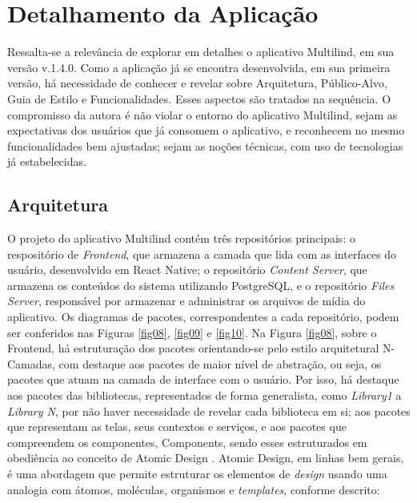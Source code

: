 \section{Detalhamento da Aplicação}
\label{sec:Detalhamento da Aplicacao}
Ressalta-se a relevância de explorar em detalhes o aplicativo Multilind, em sua versão v.1.4.0. Como a aplicação já se encontra desenvolvida, em sua primeira versão, há necessidade de conhecer e revelar sobre Arquitetura, Público-Alvo, Guia de Estilo e Funcionalidades. Esses aspectos são 
tratados na sequência. O compromisso da autora é não violar o entorno do aplicativo Multilind, sejam as expectativas dos usuários que já consomem o aplicativo, e reconhecem no mesmo funcionalidades bem ajustadas; sejam as noções técnicas, com uso de tecnologias já estabelecidas.

\subsection{Arquitetura}
\label{Arquitetura}
O projeto do aplicativo Multilind contém três repositórios principais: o respositório de \textit{Frontend}, que armazena a camada que lida com as interfaces do usuário, desenvolvido em React Native; o repositório \textit{Content Server}, que armazena os conteúdos do sistema 
utilizando PostgreSQL, e o repositório \textit{Files Server}, responsável por armazenar e administrar os arquivos de mídia do aplicativo. Os diagramas de  pacotes, correspondentes a cada repositório, podem ser conferidos nas Figuras \ref{fig08}, \ref{fig09} e \ref{fig10}. Na Figura \ref{fig08}, sobre 
o Frontend, há estruturação dos pacotes orientando-se pelo estilo arquitetural N-Camadas, com destaque aos pacotes de maior nível de abstração, ou seja, os pacotes que atuam na camada de interface com o usuário. Por isso, há destaque aos pacotes das bibliotecas, representados de forma generalista, 
como \textit{Library1} a \textit{Library N}, por não haver necessidade de revelar cada biblioteca em si; aos pacotes que representam as telas, seus contextos e serviços, e aos pacotes que compreendem os componentes, Components, sendo esses estruturados em obediência ao conceito de Atomic Design \cite{atomic}. 
Atomic Design, em linhas bem gerais, é uma abordagem que permite estruturar os elementos de \textit{design} usando uma analogia com átomos, moléculas, organismos e \textit{templates}, conforme descrito:


